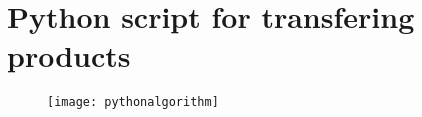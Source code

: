 \chapter{Python script for transfering products} %
\label{PythonScript}
\begin{figure}[H]
\centering
\texttt{[image: pythonalgorithm]}
\end{figure}